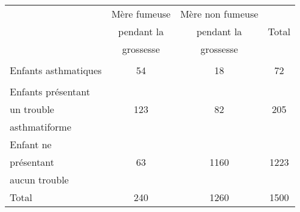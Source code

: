 \begin{tabular}{|@{\ }l@{\ }|@{\ }c@{\ }|@{\ }c@{\ }|@{\ \ \ \ \ }c@{\ \ \ \ \ }|}
	\hline
                     & Mère fumeuse & Mère non fumeuse &  \\
                     & pendant la                       & pendant la                           & Total                \\
                     & grossesse                        & grossesse                            &                      \\
	\hline
	& & &\\
Enfants asthmatiques &        54                        &    18                                & 72                   \\
	& & &\\
	\hline
Enfants présentant   &                                  &                                      &                      \\
un trouble           & 123                              &   82                                 &  205                 \\
asthmatiforme        &                                  &                                      &                      \\
	\hline
Enfant ne            &                                  &                                      &                      \\
présentant           &   63                             &    1160                              & 1223                 \\
aucun trouble        &                                  &                                      &                      \\
	\hline
Total                & 240                              &      1260                            & 1500                \\
	\hline
\end{tabular}